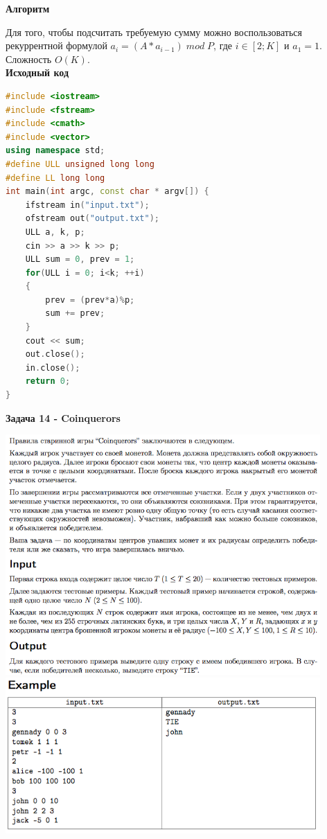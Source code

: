 \documentclass[a4paper,12pt]{article}
\begin{document}
\textbf{{\large Алгоритм}}

Для того, чтобы подсчитать требуемую сумму можно воспользоваться рекуррентной формулой $a_i = (A * a_{i-1}) \; mod \; P$, где $i \in [2; K]$ и $a_{1} = 1$. Сложность $O(K)$. \\


\textbf{{\large Исходный код}} \\
\begin{lstlisting}[language=C++]
#include <iostream>
#include <fstream>
#include <cmath>
#include <vector>
using namespace std;
#define ULL unsigned long long
#define LL long long
int main(int argc, const char * argv[]) {
    ifstream in("input.txt");
    ofstream out("output.txt");
    ULL a, k, p;
    cin >> a >> k >> p;
    ULL sum = 0, prev = 1;
    for(ULL i = 0; i<k; ++i)
    {
        prev = (prev*a)%p;
        sum += prev;
    }
    cout << sum;
    out.close();
    in.close();
    return 0;
}
\end{lstlisting}

\newpage
\textbf{{\large Задача 14 - Coinquerors}}

\begin{center}
\includegraphics[width=0.9\textwidth]{OC_Siberia/OC_Siberia_14_1.png}\\ [1cm]
\includegraphics[width=0.9\textwidth]{OC_Siberia/OC_Siberia_14_2.png}\\ [1cm]
\end{center}
\newpage
\end{document}
